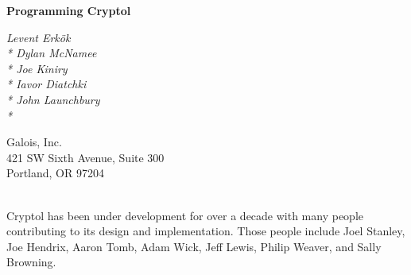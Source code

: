 \noindent
\begin{center}
{\LARGE \bf Programming Cryptol}

{\it Levent Erkök\\*
Dylan McNamee \\*
Joe Kiniry \\*
Iavor Diatchki \\*
John Launchbury \\*
}

\end{center}

\vspace{0.5in}
\noindent
Galois, Inc.\\
421 SW Sixth Avenue, Suite 300 \\
Portland, OR 97204

\pagebreak
{}\\
\vspace{0.5cm} 
\noindent Cryptol has been under development for over a decade with
many people contributing to its design and implementation.  Those
people include Joel Stanley, Joe Hendrix, Aaron Tomb, Adam Wick, Jeff
Lewis, Philip Weaver, and Sally Browning.



\vspace{1in}
\pagebreak
